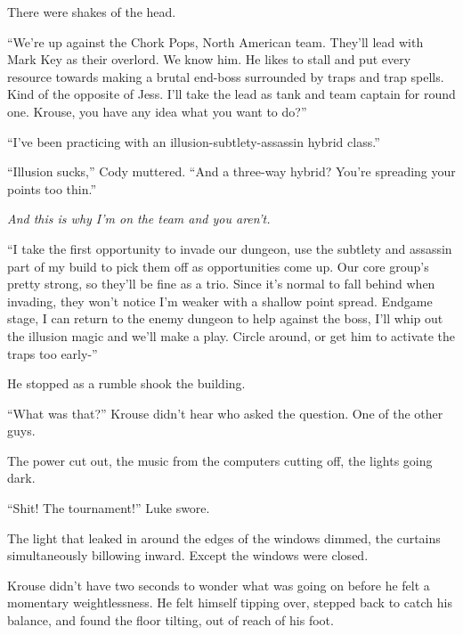 There were shakes of the head.



``We're up against the Chork Pops, North American team.  They'll lead with Mark Key as their overlord.  We know him.  He likes to stall and put every resource towards making a brutal end-boss surrounded by traps and trap spells.  Kind of the opposite of Jess.  I'll take the lead as tank and team captain for round one.  Krouse, you have any idea what you want to do?''



``I've been practicing with an illusion-subtlety-assassin hybrid class.''



``Illusion sucks,'' Cody muttered.  ``And a three-way hybrid?  You're spreading your points too thin.''



\emph{And this is why I'm on the team and you aren't.}



``I take the first opportunity to invade our dungeon, use the subtlety and assassin part of my build to pick them off as opportunities come up.  Our core group's pretty strong, so they'll be fine as a trio.  Since it's normal to fall behind when invading, they won't notice I'm weaker with a shallow point spread.  Endgame stage, I can return to the enemy dungeon to help against the boss, I'll whip out the illusion magic and we'll make a play.  Circle around, or get him to activate the traps too early-''



He stopped as a rumble shook the building.



``What was that?''  Krouse didn't hear who asked the question.  One of the other guys.



The power cut out, the music from the computers cutting off, the lights going dark.



``Shit!  The tournament!''  Luke swore.



The light that leaked in around the edges of the windows dimmed, the curtains simultaneously billowing inward.  Except the windows were closed.



Krouse didn't have two seconds to wonder what was going on before he felt a momentary weightlessness.  He felt himself tipping over, stepped back to catch his balance, and found the floor tilting, out of reach of his foot.




